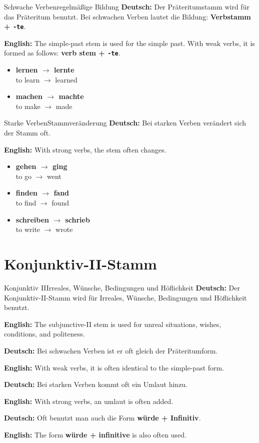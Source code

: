 \documentclass[a4paper,11pt]{article}
\newcommand{\GermanText}[1]{\textbf{Deutsch: }#1\par}
\newcommand{\EnglishText}[1]{{\small\color{SoftGray}\textbf{English: }#1\par}}
\newcommand{\ExampleItem}[2]{\item \textbf{#1}\\{\small\color{SoftGray}#2}}
\begin{document}
        \begin{grammarentry}{Schwache Verben}{regelmäßige Bildung}
            \GermanText{Der Präteritumstamm wird für das Präteritum benutzt. Bei schwachen Verben lautet die Bildung: \textbf{Verbstamm + \texttt{-te}}.}
            \EnglishText{The simple-past stem is used for the simple past. With weak verbs, it is formed as follows: \textbf{verb stem + \texttt{-te}}.}
        \end{grammarentry}

        \begin{exbox}
            \begin{itemize}
                \ExampleItem{lernen $\rightarrow$ lernte}{to learn $\rightarrow$ learned}
                \ExampleItem{machen $\rightarrow$ machte}{to make $\rightarrow$ made}
            \end{itemize}
        \end{exbox}

        \begin{grammarentry}{Starke Verben}{Stammveränderung}
            \GermanText{Bei starken Verben verändert sich der Stamm oft.}
            \EnglishText{With strong verbs, the stem often changes.}
        \end{grammarentry}

        \begin{exbox}
            \begin{itemize}
                \ExampleItem{gehen $\rightarrow$ ging}{to go $\rightarrow$ went}
                \ExampleItem{finden $\rightarrow$ fand}{to find $\rightarrow$ found}
                \ExampleItem{schreiben $\rightarrow$ schrieb}{to write $\rightarrow$ wrote}
            \end{itemize}
        \end{exbox}

    \section{Konjunktiv-II-Stamm}

        \begin{grammarentry}{Konjunktiv II}{Irreales, Wünsche, Bedingungen und Höflichkeit}
            \GermanText{Der Konjunktiv-II-Stamm wird für Irreales, Wünsche, Bedingungen und Höflichkeit benutzt.}
            \EnglishText{The subjunctive-II stem is used for unreal situations, wishes, conditions, and politeness.}

            \GermanText{Bei schwachen Verben ist er oft gleich der Präteritumform.}
            \EnglishText{With weak verbs, it is often identical to the simple-past form.}

            \GermanText{Bei starken Verben kommt oft ein Umlaut hinzu.}
            \EnglishText{With strong verbs, an umlaut is often added.}

            \GermanText{Oft benutzt man auch die Form \textbf{würde + Infinitiv}.}
            \EnglishText{The form \textbf{würde + infinitive} is also often used.}
        \end{grammarentry}
\end{document}
